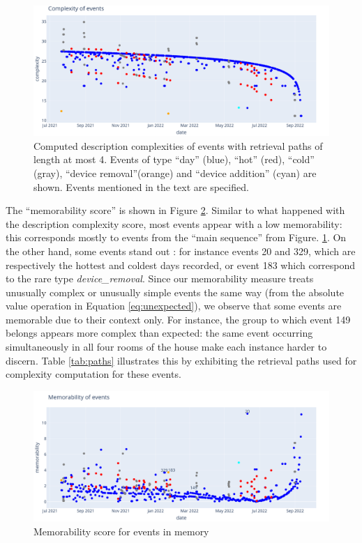 \documentclass[entropy,article,submit,moreauthors,pdftex]{Definitions/mdpi}
\begin{document}
\begin{figure}[ht]
    \centering
    \includegraphics[width=.9\linewidth]{figures/complexity_scenar_2.png}
    \caption{Computed description complexities of events with retrieval paths of
        length at most 4. Events of type ``day'' (blue), ``hot'' (red), ``cold''
        (gray), ``device removal''(orange) and ``device addition'' (cyan) are shown. Events mentioned in the text are specified.}
    \label{fig:computed_cplx}
\end{figure}

The ``memorability score'' is shown in Figure \ref{fig:result1}. Similar to what happened with the description complexity score, most events appear with a low memorability: this corresponds mostly to events from the ``main sequence'' from Figure. \ref{fig:computed_cplx}. On the other hand, some events stand out : for instance events 20 and 329, which are respectively the hottest and coldest days recorded, or event 183 which correspond to the rare type \emph{device\_removal}.
Since our memorability measure treats unusually complex or unusually simple events the
same way (from the absolute value operation in Equation \ref{eq:unexpected}), we
observe that some events are memorable due to their context only. For instance,
the group to which event 149 belongs appears more complex than expected: the same event occurring simultaneously in all four rooms of the house make each instance harder to discern.
Table \ref{tab:paths} illustrates this by exhibiting the retrieval paths used for complexity computation for these events.

\begin{figure}[ht]
    \centering
    \includegraphics[width=.8\linewidth]{figures/memo_scenar_2.png}
    \caption{Memorability score for events in memory}
    \label{fig:result1}
\end{figure}
\end{document}
